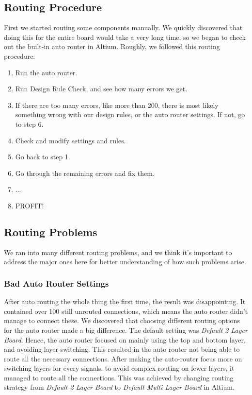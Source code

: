 \subsection{Routing Procedure}
First we started routing some components manually. We quickly discovered that doing this for the entire board would take a very long time, so we began to check out the built-in auto router in Altium. 
\newline
\newline
Roughly, we followed this routing procedure:
\begin{enumerate}
\item Run the auto router.
\item Run Design Rule Check, and see how many errors we get. 
\item If there are too many errors, like more than 200, there is most likely something wrong with our design rules, or the auto router settings. If not, go to step 6.
\item Check and modify settings and rules.
\item Go back to step 1.
\item Go through the remaining errors and fix them. 
\item ...
\item PROFIT!
\end{enumerate}
\subsection{Routing Problems}
We ran into many different routing problems, and we think it's important to address the major ones here for better understanding of how such problems arise.

\subsubsection{Bad Auto Router Settings}
After auto routing the whole thing the first time, the result was disappointing. It contained over 100 still unrouted connections, which means the auto router didn't manage to connect these.
\newline
\newline
We discovered that choosing different routing options for the auto router made a big difference. The default setting was \emph{Default 2 Layer Board}. Hence, the auto router focused on mainly using the top and bottom layer, and avoiding layer-switching. This resulted in the auto router not being able to route all the necessary connections.
\newline
\newline
After making the auto-router focus more on switching layers for every signals, to avoid complex routing on fewer layers, it managed to route all the connections. This was achieved by changing routing strategy from \emph{Default 2 Layer Board} to \emph{Default Multi Layer Board} in Altium.

